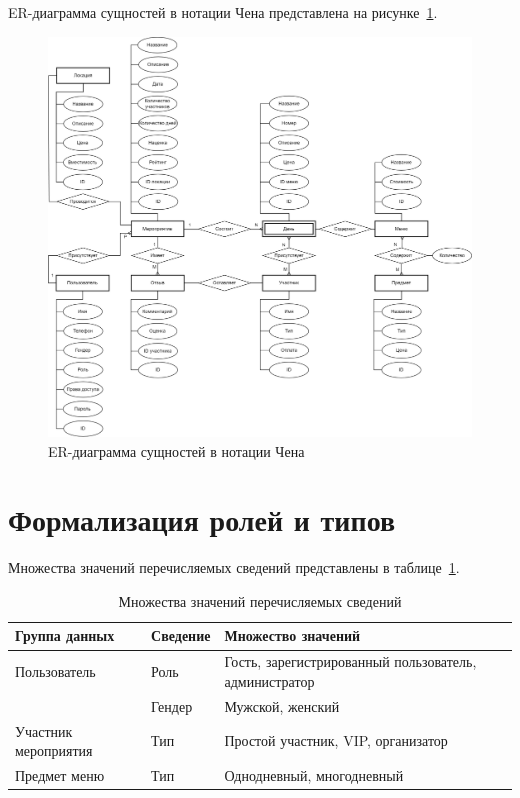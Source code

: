 \newpage

ER-диаграмма сущностей в нотации Чена представлена на рисунке~\ref{fig:er-diagram}.

\begin{figure}[h]
	\centering
	\includegraphics[width=1\textwidth]{images/er-diagram.png}
	\caption{ER-диаграмма сущностей в нотации Чена} 
	\label{fig:er-diagram} 
\end{figure}

\newpage

\section{Формализация ролей и типов}

Множества значений перечисляемых сведений представлены в таблице~\ref{tbl:data-groups-types}.

\begin{table}[h]
	\centering
	\caption{Множества значений перечисляемых сведений}
	\begin{tabularx}{\textwidth}{|p{5cm}|p{2cm}|X|}
		\hline
		\textbf{Группа данных} & \textbf{Сведение} & \textbf{Множество значений} \\
		\hline
		Пользователь & Роль & Гость, зарегистрированный пользователь, администратор \\
		\cline{2-3}
		& Гендер & Мужской, женский \\
		\hline
		Участник мероприятия & Тип & Простой участник, VIP, организатор \\
		\hline
		Предмет меню & Тип & Однодневный, многодневный \\
		\hline
	\end{tabularx}
	\label{tbl:data-groups-types}
\end{table}


